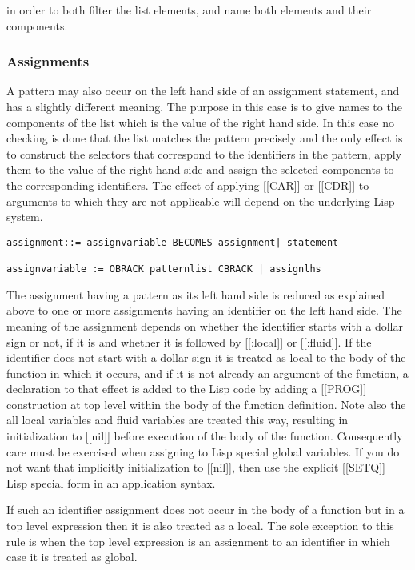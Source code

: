 \documentclass{article}
\begin{document}
in order to both filter the list elements, and name both elements and
their components.
 
\subsubsection{Assignments}
\label{sec:boot:assignment}
 
A pattern may also occur on the left hand side of an assignment
statement, and has a slightly different meaning.
The purpose in this case is to give names to the components
of the list which is the value of the right hand side.
In this case no checking
is done that the list matches the pattern precisely and the only
effect is to construct the selectors that correspond to
the identifiers in the pattern, apply them to the value of the
right hand side and assign the selected components
to the corresponding identifiers.
The effect of applying [[CAR]] or [[CDR]] to arguments to which they are not
applicable will depend on the underlying Lisp system.
\begin{verbatim}  
assignment::= assignvariable BECOMES assignment| statement
 
assignvariable := OBRACK patternlist CBRACK | assignlhs
\end{verbatim} 

The assignment having a pattern as its left hand side is reduced
as explained above to one or more assignments having an identifier
on the left hand side.
The meaning of the assignment depends on whether the identifier
starts with a dollar sign or not, if it is and whether it is followed by
[[:local]] or [[:fluid]].
If the identifier does not start with a dollar sign it
is treated as local to the body of the function in which it
occurs, and
if it is not already an argument of the function,
a declaration to that effect is added to the Lisp code
by adding a [[PROG]] construction at top level within the body of the
function definition.  Note also the all local variables and fluid variables
are treated this way, resulting in initialization to [[nil]] before
execution of the body of the function.  Consequently care must be
exercised when assigning to Lisp special global variables.  If you
do not want that implicitly initialization to [[nil]], then use the
explicit [[SETQ]] Lisp special form in an application syntax.
 
If such an identifier assignment does not occur in the body
of a function but in a top level expression then
it is also treated as a local. The sole exception to this rule
is when the top level expression is an assignment to an identifier
in which case it is treated as global.
 
\end{document}
